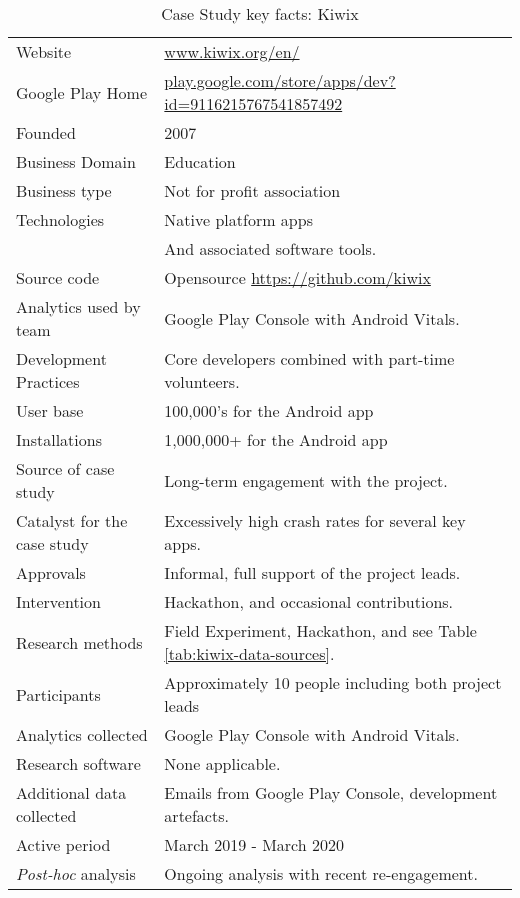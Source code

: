 {\renewcommand{\arraystretch}{0.8}%
\begin{table*}
    \centering
    \small
    \begin{tabular}{lp{9cm}}
       \toprule
       Website &\href{https://www.kiwix.org/en/}{www.kiwix.org/en/}  \\
       Google Play Home & \href{https://play.google.com/store/apps/dev?id=9116215767541857492}{play.google.com/store/apps/dev?id=9116215767541857492} \\
       Founded & 2007 \\
       Business Domain & Education \\
       Business type & Not for profit association \\
       Technologies  & Native platform apps \\
       & And associated software tools. \\
       Source code  & Opensource \url{https://github.com/kiwix} \\
       Analytics used by team & Google Play Console with Android Vitals. \\
       Development Practices & Core developers combined with part-time volunteers. \\
       \arrayrulecolor{blue!20}\midrule
       User base & 100,000's for the Android app \\
       Installations & 1,000,000+ for the Android app \\
       \arrayrulecolor{blue!20}\midrule       
       Source of case study &Long-term engagement with the project. \\
       Catalyst for the case study &Excessively high crash rates for several key apps. \\
       Approvals &Informal, full support of the project leads. \\
       \arrayrulecolor{blue!20}\midrule
       Intervention &Hackathon, and occasional contributions. \\
       Research methods &Field Experiment, Hackathon, and see Table \ref{tab:kiwix-data-sources}.  \\
       Participants &Approximately 10 people including both project leads \\
       Analytics collected &Google Play Console with Android Vitals. \\
       Research software & None applicable. \\
       Additional data collected &Emails from Google Play Console, development artefacts. \\
       Active period & March 2019 - March 2020 \\
       \arrayrulecolor{blue!20}\midrule
       \emph{Post-hoc} analysis & Ongoing analysis with recent re-engagement. \\ 
       \bottomrule
    \end{tabular}
    \caption{Case Study key facts: Kiwix}
    \label{tab:kiwix_anaytics_overview}
\end{table*}
}

